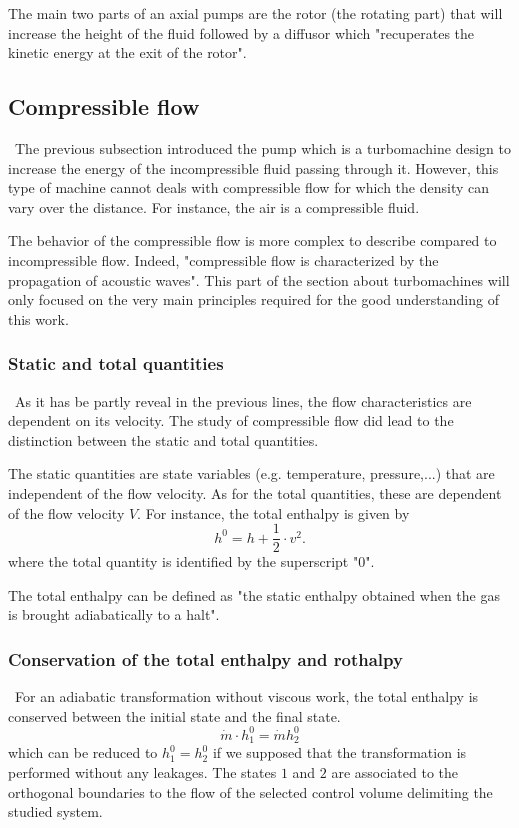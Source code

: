 The main two parts of an axial pumps are the rotor (the rotating part) that will increase the height of the fluid followed by a diffusor which "recuperates the kinetic energy at the exit of the rotor"\citep{Hillewaert2019}.

\subsection{Compressible flow}
\quad\, The previous subsection introduced the pump which is a turbomachine design to increase the energy of the incompressible fluid passing through it. However, this type of machine cannot deals with compressible flow for which the density can vary over the distance. For instance, the air is a compressible fluid. 

The behavior of the compressible flow is more complex to describe compared to incompressible flow. Indeed, "compressible flow is characterized by the propagation of acoustic waves"\citep{Hillewaert2019}.   This part of the section about turbomachines will only focused on the very main principles required for the good understanding of this work.

\subsubsection{Static and total quantities}
\quad\, As it has be partly reveal in the previous lines, the flow characteristics are dependent on its velocity. The study of compressible flow did lead to the distinction between the static and total quantities. 

The static quantities are state variables (e.g. temperature, pressure,...) that are independent of the flow velocity. As for the total quantities, these are dependent of the flow velocity $V$. For instance, the total enthalpy is given by
$$
h^0 = h + \frac{1}{2}\cdot v^2.
$$
where the total quantity is identified by the superscript "0".

The total enthalpy can be defined as "the static enthalpy obtained when the gas is brought adiabatically to a halt"\citep{Hillewaert2019}.


\subsubsection{Conservation of the total enthalpy and rothalpy}
\quad\, For an adiabatic transformation without viscous work, the total enthalpy is conserved between the initial state and the final state.
\begin{equation}
\dot{m}\cdot h_1^0 = \dot{m} h_2^0 \label{eq:C3_hcons}
\end{equation}
which can be reduced to $h_1^0 = h_2^0$ if we supposed that the transformation is performed without any leakages. The states $1$ and $2$ are associated to the orthogonal boundaries to the flow of the selected control volume delimiting the studied system. 

